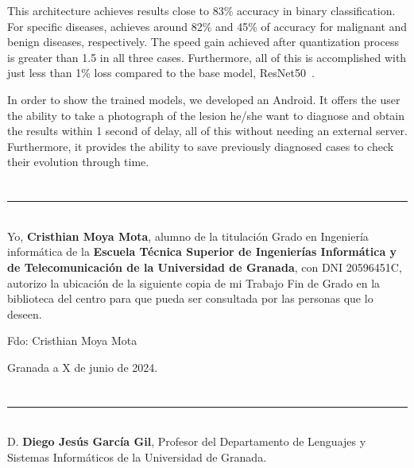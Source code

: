 This architecture achieves results close to 83\% accuracy in binary classification. For specific diseases, achieves around 82\% and 45\% of accuracy for malignant and benign diseases, respectively. The speed gain achieved after quantization process is greater than 1.5 in all three cases. Furthermore, all of this is accomplished with just less than 1\% loss compared to the base model, ResNet50~\cite{he2015deep}.

In order to show the trained models, we developed an Android. It offers the user the ability to take a photograph of the lesion he/she want to diagnose and obtain the results within 1 second of delay, all of this without needing an external server. Furthermore, it provides the ability to save previously diagnosed cases to check their evolution through time.


\chapter*{}
\thispagestyle{empty}

\noindent\rule[-1ex]{\textwidth}{2pt}\\[4.5ex]

Yo, \textbf{Cristhian Moya Mota}, alumno de la titulación Grado en Ingeniería informática de la \textbf{Escuela Técnica Superior
de Ingenierías Informática y de Telecomunicación de la Universidad de Granada}, con DNI 20596451C, autorizo la
ubicación de la siguiente copia de mi Trabajo Fin de Grado en la biblioteca del centro para que pueda ser
consultada por las personas que lo deseen.

\vspace{6cm}

\noindent Fdo: Cristhian Moya Mota

\vspace{2cm}

\begin{flushright}
Granada a X de junio de 2024.
\end{flushright}


\chapter*{}
\thispagestyle{empty}

\noindent\rule[-1ex]{\textwidth}{2pt}\\[4.5ex]

D. \textbf{Diego Jesús García Gil}, Profesor del Departamento de Lenguajes y Sistemas Informáticos de la Universidad de Granada.

